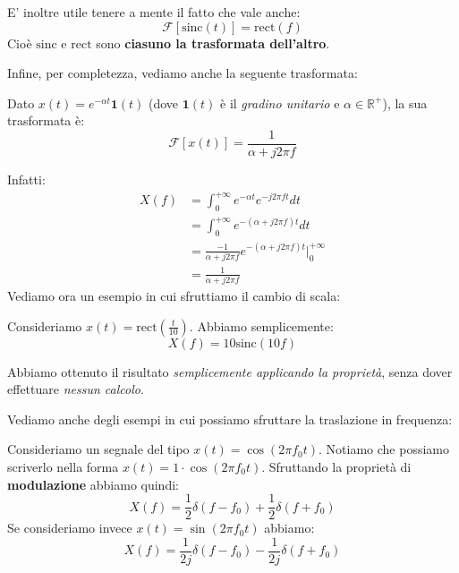 \begin{remark}
    E' inoltre utile tenere a mente il fatto che vale anche:
    \[
        \mathcal{F}[\text{sinc}(t)] = \text{rect}(f)
    \] 
    Cioè $\text{sinc}$ e $\text{rect}$ sono \textbf{ciasuno la trasformata dell'altro}.
\end{remark}

Infine, per completezza, vediamo anche la seguente trasformata:

\begin{prop}
    Dato $x(t) = e^{-\alpha t}\mathbf{1}(t)$ (dove $\mathbf{1}(t)$ è il \textit{gradino unitario}
    e $\alpha\in \mathbb{R}^+$), la sua trasformata è:
    \[
        \mathcal{F}[x(t)] = \frac{1}{\alpha + j2\pi f}
    \] 
\end{prop}

Infatti:
\[
    \begin{aligned}
        X(f) &= \int_0^{+\infty} e^{-\alpha t} e^{-j 2\pi ft}dt \\ 
             &= \int_{0}^{+\infty} e^{-(\alpha + j2\pi f)t}dt \\ 
             &= \frac{-1}{\alpha + j 2\pi f} e^{-(\alpha + j 2\pi f)t}\bigg|_{0}^{+\infty} \\ 
             &= \frac{1}{\alpha + j 2\pi f}
    \end{aligned}
\]
Vediamo ora un esempio in cui sfruttiamo il cambio di scala:

\begin{exa}
    Consideriamo $x(t) = \text{rect}\left( \frac{t}{10} \right)$.
    Abbiamo semplicemente:
    \[
        X(f) = 10 \text{sinc}(10f)
    \] 
\end{exa}

Abbiamo ottenuto il risultato \textit{semplicemente applicando la proprietà}, senza
dover effettuare \textit{nessun calcolo}.

Vediamo anche degli esempi in cui possiamo sfruttare la traslazione in frequenza:

\begin{exa}[MODULAZIONE]
    Consideriamo un segnale del tipo $x(t)=\cos (2\pi f_{0}t)$. 
    Notiamo che possiamo scriverlo nella forma $x(t) = 1\cdot \cos (2\pi f_{0}t)$.
    Sfruttando la proprietà di \textbf{modulazione} abbiamo quindi:
    \[
        X(f) =\frac{1}{2}\delta(f-f_{0}) + \frac{1}{2}\delta(f+f_{0})
    \]
    Se consideriamo invece $x(t)=\sin (2\pi f_{0}t)$ abbiamo:
    \[
        X(f) = \frac{1}{2j}\delta(f-f_{0}) - \frac{1}{2j}\delta(f+f_{0})
    \] 
\end{exa}

